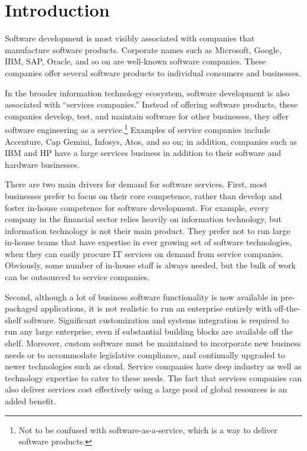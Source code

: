 \section{Introduction}
\label{sec:intro}

Software development is most visibly associated with companies that manufacture
software products.  Corporate names such as Microsoft, Google, IBM, SAP, Oracle,
and so on are well-known software companies.  These companies offer several
software products to individual consumers and businesses.

In the broader information technology ecosystem, software development is also
associated with ``services companies.''  Instead of offering software products,
these companies develop, test, and maintain software for other businesses, \ie
they offer software engineering as a service.\footnote{\small Not to be confused
  with software-as-a-service, which is a way to deliver software products.}
Examples of service companies include Accenture, Cap Gemini, Infosys, Atos, and
so on; in addition, companies such as IBM and HP have a large services business
in addition to their software and hardware businesses.

There are two main drivers for demand for software services.  First, most
businesses prefer to focus on their core competence, rather than develop and
foster in-house competence for software development.  For example, every company
in the financial sector relies heavily on information technology, but
information technology is not their main product. They prefer not to run large 
in-house teams that have expertise
in ever growing set of software technologies, when they can easily procure IT
services on demand from service companies. Obviously, some number of in-house
staff is always needed, but the bulk of work can be outsourced to service
companies.

Second, although a lot of business software functionality is now available in
pre-packaged applications, it is not realistic to run an enterprise entirely
with off-the-shelf software. Significant custom\-ization and systems integration
is required to run any large enterprise, even if substantial building blocks are
available off the shelf. Moreover, custom software must be maintained to
incorporate new business needs or to accommodate legislative compliance, and
continually upgraded to newer technologies such as cloud. Service companies have
deep industry as well as technology expertise to cater to these needs. The fact
that services companies can also deliver services cost effectively using a large
pool of global resources is an added benefit.

